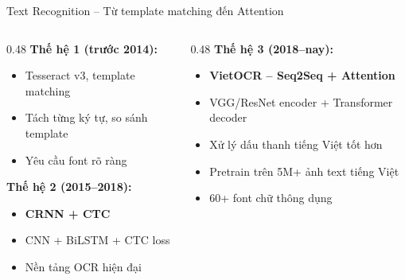 \documentclass[aspectratio=169]{beamer}
\begin{document}
\begin{frame}{Text Recognition -- Từ template matching đến Attention}
    \begin{columns}[T]
        \begin{column}{0.48\textwidth}
            \textbf{Thế hệ 1 (trước 2014):}
            \begin{itemize}
                \item Tesseract v3, template matching
                \item Tách từng ký tự, so sánh template
                \item Yêu cầu font rõ ràng
            \end{itemize}
            \vspace{0.3cm}
            \textbf{Thế hệ 2 (2015--2018):}
            \begin{itemize}
                \item \textbf{CRNN + CTC}
                \item CNN + BiLSTM + CTC loss
                \item Nền tảng OCR hiện đại
            \end{itemize}
        \end{column}
        \begin{column}{0.48\textwidth}
            \textbf{Thế hệ 3 (2018--nay):}
            \begin{itemize}
                \item \textbf{VietOCR -- Seq2Seq + Attention}
                \item VGG/ResNet encoder + Transformer decoder
                \item Xử lý dấu thanh tiếng Việt tốt hơn
                \item Pretrain trên 5M+ ảnh text tiếng Việt
                \item 60+ font chữ thông dụng
            \end{itemize}
        \end{column}
    \end{columns}
\end{frame}
\end{document}
